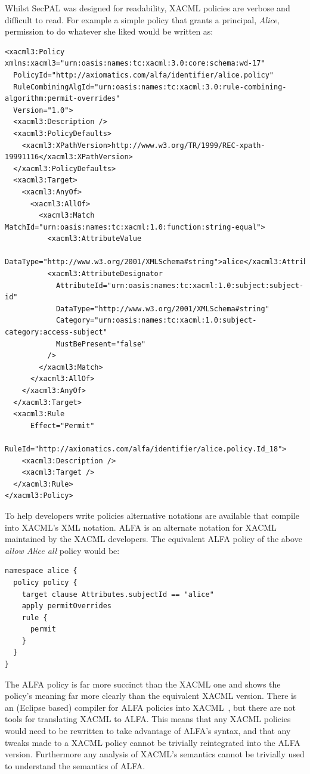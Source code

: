 \documentclass[thesis.tex]{subfiles}
\begin{document}
Whilst SecPAL was designed for readability, XACML policies are verbose and
difficult to read. For example a simple policy that grants a principal,
\emph{Alice}, permission to do whatever she liked would be written as:

\begin{lstlisting}
<xacml3:Policy xmlns:xacml3="urn:oasis:names:tc:xacml:3.0:core:schema:wd-17"
  PolicyId="http://axiomatics.com/alfa/identifier/alice.policy"
  RuleCombiningAlgId="urn:oasis:names:tc:xacml:3.0:rule-combining-algorithm:permit-overrides"
  Version="1.0">
  <xacml3:Description />
  <xacml3:PolicyDefaults>
    <xacml3:XPathVersion>http://www.w3.org/TR/1999/REC-xpath-19991116</xacml3:XPathVersion>
  </xacml3:PolicyDefaults>
  <xacml3:Target>
    <xacml3:AnyOf>
      <xacml3:AllOf>
        <xacml3:Match MatchId="urn:oasis:names:tc:xacml:1.0:function:string-equal">
          <xacml3:AttributeValue
            DataType="http://www.w3.org/2001/XMLSchema#string">alice</xacml3:AttributeValue>
          <xacml3:AttributeDesignator 
            AttributeId="urn:oasis:names:tc:xacml:1.0:subject:subject-id"
            DataType="http://www.w3.org/2001/XMLSchema#string"
            Category="urn:oasis:names:tc:xacml:1.0:subject-category:access-subject"
            MustBePresent="false"
          />
        </xacml3:Match>
      </xacml3:AllOf>
    </xacml3:AnyOf>
  </xacml3:Target>
  <xacml3:Rule 
      Effect="Permit"
      RuleId="http://axiomatics.com/alfa/identifier/alice.policy.Id_18">
    <xacml3:Description />
    <xacml3:Target />
  </xacml3:Rule>
</xacml3:Policy>
\end{lstlisting}

To help developers write policies alternative notations are available that
compile into XACML's XML notation. ALFA is an alternate notation for
XACML~\cite{oasis_xacml_technical_comitee_abbreviated_2015} maintained by the
XACML developers. The equivalent ALFA policy of the above \emph{allow Alice all}
policy would be:

\begin{lstlisting}
namespace alice {
  policy policy {
    target clause Attributes.subjectId == "alice"
    apply permitOverrides
    rule {
      permit
    }
  }
}
\end{lstlisting}

The ALFA policy is far more succinct than the XACML one and shows the
policy's meaning far more clearly than the equivalent XACML version.
There is an (Eclipse based) compiler for ALFA policies into
XACML~\cite{axiomaics_axiomatics_2012}, but there are not tools for
translating XACML to ALFA.  This means that any XACML policies would
need to be rewritten to take advantage of ALFA's syntax, and that any
tweaks made to a XACML policy cannot be trivially reintegrated into
the ALFA version.  Furthermore any analysis of XACML's semantics cannot
be trivially used to understand the semantics of ALFA.
\end{document}
